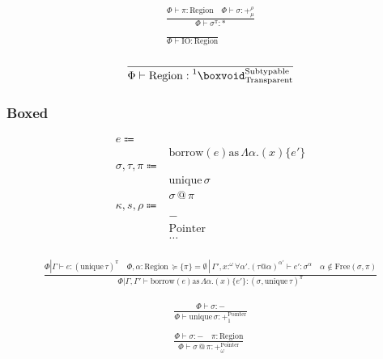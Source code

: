 \documentclass {article}
\begin{document}
\begin{gather*}
\frac
{\Phi \vdash \pi : \text{Region} \quad \Phi \vdash \sigma : +^\rho_\mu}
{\Phi \vdash \sigma^\pi : *} \\
\\
\frac
{}
{\Phi \vdash \text{IO} : \text{Region}}
\end{gather*}

\begin{gather*}
\frac
{}
{\Phi \vdash \text{Region} : \prescript {1} {} \boxvoid^{\text{Subtypable}}_{\text{Transparent}}} \\
\end{gather*}

\subsubsection{Boxed}
\begin{align*}
e \Coloneqq & \\
& \text{borrow} (e) \text{as} \, \Lambda \alpha. (x) \{ e' \} \\
\sigma, \tau, \pi \Coloneqq & \\
& \text{unique} \, \sigma \\
& \sigma \, @ \, \pi \\
\kappa, s, \rho \Coloneqq & \\
& - \tag{Boxed} \\
& \text{Pointer} \tag{Pointer Representation} \\
& \dots \\
\end{align*}

\begin{gather*}
\frac
{\Phi | \Gamma \vdash e : (\text{unique} \, \tau)^\pi \quad \Phi,\alpha : \text{Region} \, \succeq \{ \pi \} = \emptyset \, | \, \Gamma', x :^\omega \forall \alpha'. (\tau @ \alpha)^{\alpha'} \vdash e' : \sigma^\alpha \quad \alpha \notin \text{Free}(\sigma, \pi)}
{\Phi | \Gamma, \Gamma' \vdash \text{borrow} (e) \text{as} \, \Lambda \alpha. (x) \{ e' \} : (\sigma, \text{unique} \, \tau)^\pi }
\end{gather*}

\begin{gather*}
\frac
{\Phi \vdash \sigma : -}
{\Phi \vdash \text{unique} \, \sigma : +^\text{Pointer}_1} \\
\\
\frac
{\Phi \vdash \sigma : - \quad \pi : \text{Region}}
{\Phi \vdash \sigma \, @ \, \pi : +^\text{Pointer}_\omega} 
\end{gather*}
\end{document}
